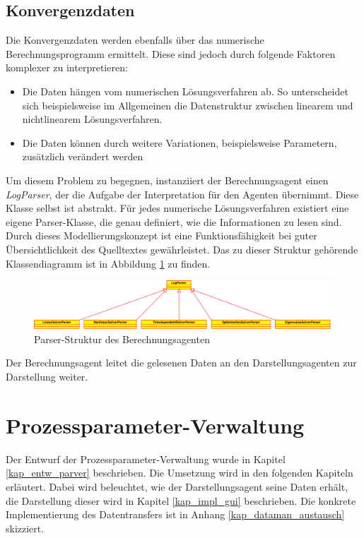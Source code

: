\documentclass[a4paper,12pt,oneside,openright,onecolumn,final,titlepage,fleqn,ngerman]{scrreprt}
\newcommand{\calcag}{Berechnungsagent}
\newcommand{\repag}{Darstellungsagent}
\begin{document}
	\subsection{Konvergenzdaten}\label{kap_impl_konvdata}
	Die Konvergenzdaten werden ebenfalls über das numerische Berechnungsprogramm ermittelt. Diese sind jedoch durch folgende Faktoren komplexer zu interpretieren:
	\begin{itemize}
		\item Die Daten hängen vom numerischen Lösungsverfahren ab. So unterscheidet sich beispielsweise im Allgemeinen die Datenstruktur zwischen linearem und nichtlinearem Lösungsverfahren.
		\item Die Daten können durch weitere Variationen, beispielsweise Parametern, zu\-sätz\-lich verändert werden
	\end{itemize}

	Um diesem Problem zu begegnen, instanziiert der \calcag{} einen \emph{LogParser}, der die Aufgabe der Interpretation für den Agenten übernimmt. Diese Klasse selbst ist abstrakt. Für jedes numerische Lö\-sungs\-ver\-fah\-ren existiert eine eigene Parser-Klasse, die genau definiert, wie die Informationen zu lesen sind. Durch dieses Modellierungskonzept ist eine Funktionsfähigkeit bei guter Über\-sicht\-lich\-keit des Quelltextes gewährleistet. Das zu dieser Struktur gehörende Klassendiagramm ist in Abbildung \ref{calcag_parser} zu finden.
	\begin{figure}[ht]
		\includegraphics[keepaspectratio=true,width=\textwidth]{res/Klassendiagramm_CalculationAgent_Parser.png}
		\caption{Parser-Struktur des \calcag{}en}
		\label{calcag_parser}
	\end{figure}
	
	Der \calcag{} leitet die gelesenen Daten an den \repag{}en zur Darstellung weiter.
	
	\section{Prozessparameter-Verwaltung}\label{kap_implParver}
	Der Entwurf der Prozessparameter-Verwaltung wurde in Kapitel \ref{kap_entw_parver} beschrieben. Die Umsetzung wird in den folgenden Kapiteln erläutert. Dabei wird beleuchtet, wie der \repag{} seine Daten erhält, die Darstellung dieser wird in Kapitel \ref{kap_impl_gui} beschrieben. Die konkrete Implementierung des Datentransfers ist in Anhang \ref{kap_dataman_austausch} skizziert.
	
\end{document}
